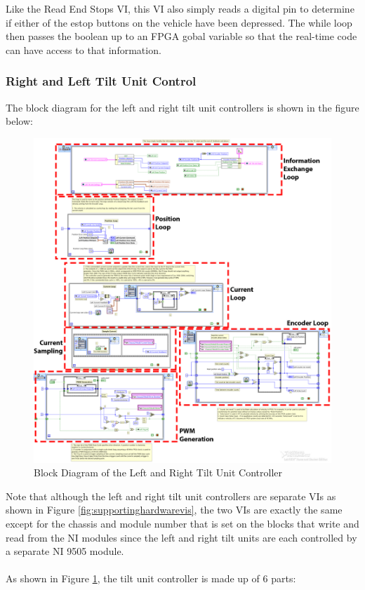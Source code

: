 \noindent Like the Read End Stops VI, this VI also simply reads a digital pin to determine if either of the estop buttons on the vehicle have been depressed. The while loop then passes the boolean up to an FPGA gobal variable so that the real-time code can have access to that information.

\newpage

\subsubsection{Right and Left Tilt Unit Control}

The block diagram for the left and right tilt unit controllers is shown in the figure below:

\begin{figure}[h!]
\centering
\includegraphics[scale=0.65]{Photos/tucontroller.png}
\caption{Block Diagram of the Left and Right Tilt Unit Controller}
\label{fig:tucontroller}
\end{figure}

\noindent Note that although the left and right tilt unit controllers are separate VIs as shown in Figure \ref{fig:supportinghardwarevis}, the two VIs are exactly the same except for the chassis and module number that is set on the blocks that write and read from the NI modules since the left and right tilt units are each controlled by a separate NI 9505 module.\\ \\
%
As shown in Figure \ref{fig:tucontroller}, the tilt unit controller is made up of 6 parts:

